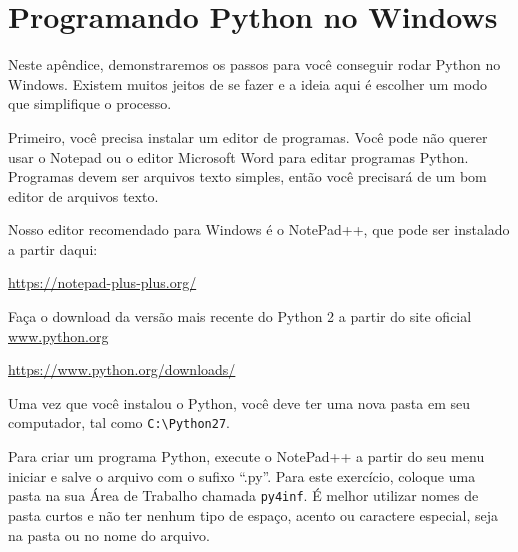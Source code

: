 
\chapter{Programando Python no Windows}
%

Neste apêndice, demonstraremos os passos para você
conseguir rodar Python no Windows. Existem muitos jeitos
de se fazer e a ideia aqui é escolher um modo que simplifique
o processo.
%

Primeiro, você precisa instalar um editor de programas.
Você pode não querer usar o Notepad ou o editor Microsoft
Word para editar programas Python. Programas devem ser arquivos
texto simples, então você precisará de um bom editor de arquivos
texto.
%

Nosso editor recomendado para Windows é o NotePad++, que pode
ser instalado a partir daqui:
%

\url{https://notepad-plus-plus.org/}

Faça o download da versão mais recente do Python 2 a partir
 do site oficial \url{www.python.org}

\url{https://www.python.org/downloads/}

Uma vez que você instalou o Python, você deve ter uma nova
pasta em seu computador, tal como {\tt C:{\textbackslash}Python27}.
%

Para criar um programa Python, execute o NotePad++ a partir do
seu menu iniciar e salve o arquivo com o sufixo ``.py''. Para
este exercício, coloque uma pasta na sua Área de Trabalho chamada
{\tt py4inf}. É melhor utilizar nomes de pasta curtos e não ter 
nenhum tipo de espaço, acento ou caractere especial, seja na pasta
ou no nome do arquivo.
%

